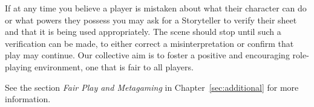 If at any time you believe a player is mistaken about what their character can do or what powers they possess 
you may ask for a Storyteller to verify their sheet and that it is being used appropriately.  The scene should 
stop until such a verification can be made, to either correct a misinterpretation or confirm that play 
may continue.  Our collective aim is to foster a positive and encouraging role-playing environment, one that 
is fair to all players.

See the section \emph{Fair Play and Metagaming} in Chapter~\ref{sec:additional} for more information.